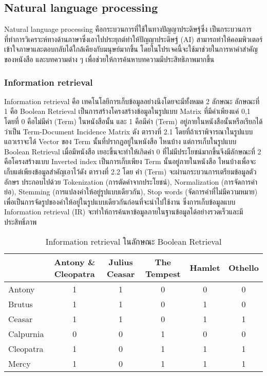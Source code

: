 \subsection{Natural language processing}

Natural language processing คือกระบวนการที่ใช้ในทางปัญญาประดิษฐ์ซึ่ง เป็นกระบวนการที่ทำการวิเคราะห์ทางด้านภาษาซึ่งเอาไปประยุกต์ทำให้ปัญญาประดิษฐ์ (AI) สามารถทำให้คอมพิวเตอร์เข้าใจภาษาและตอบกลับได้ใกล้เคียงกับมนุษย์มากขึ้น โดยในโปรเจคนี้จะใช้มาช่วยในการหาคำสำคัญของหนังสือ และบทความต่าง ๆ เพื่อช่วยให้การค้นหาบทความมีประสิทธิภาพมากขึ้น

\subsubsection{Information retrieval}

Information retrieval คือ เทคโนโลยีการเก็บข้อมูลอย่างนึงโดยจะมีทั้งหมด 2 ลักษณะ ลักษณะที่ 1 คือ Boolean Retrieval เป็นการสร้างโครงสร้างข้อมูลในรูปแบบ Matrix ที่มีค่าเพียงแค่ 0,1 โดยที่ 0 คือไม่มีคำ (Term) ในหนังสือนั้น และ 1 คือมีคำ (Term) อยู่ภายในหนังสือนั้นหรือเรียกได้ว่าเป็น Term-Document Incidence  Matrix ดัง ตารางที่ 2.1 โดยที่ถ้าเราพิจารณาในรูปแบบแถวเราจะได้ Vector ของ Term นั้นที่ปรากฏอยู่ในหนังสือ ไหนบ้าง แต่การเก็บในรูปแบบ Boolean Retrieval เมื่อมีหนังสือ เยอะขึ้นจะทำให้เกิดค่า 0 ที่ไม่มีประโยชน์มากขึ้นจึงมีลักษณะที่ 2 คือโครงสร้างแบบ Inverted index เป็นการเก็บเพียง Term นั้นอยู่ภายในหนังสือ ไหนบ้างเพื่อจะเก็บแต่เพียงข้อมูลสำคัญเอาไว้ดัง ตารางที่ 2.2 โดย คำ (Term) จะผ่านกระบวนการเตรียมข้อมูลตัวอักษร ประกอบไปด้วย Tokenization (การตัดคำจากประโยชน์), Normalization (การจัดการคำย่อ), Stemming (การแปลงคำให้อยู่รูปแบบเดียวกัน), Stop words (จัดการคำที่ไม่มีความหมาย) เพื่อเป็นการจัดรูปของคำให้อยู่ในรูปแบบเดียวกันก่อนที่จะนำไปใช้งาน ซึ่งการเก็บข้อมูลแบบ Information retrieval (IR) จะทำให้การค้นหาข้อมูลภายในฐานข้อมูลได้อย่างรวดเร็วและมีประสิทธิ์ภาพ
\begin{table}[H]
\caption{Information retrieval ในลักษณะ Boolean Retrieval}\label{tbl:ir}
    \begin{tabular}{|l|c|c|c|c|c|}
        \hline
                  & Antony \& Cleopatra & Julius Ceasar & The Tempest & Hamlet & Othello \\ \hline
        Antony    & 1                   & 1             & 0           & 0      & 0       \\ \hline
        Brutus    & 1                   & 1             & 0           & 1      & 0       \\ \hline
        Ceasar    & 1                   & 1             & 0           & 1      & 1       \\ \hline
        Calpurnia & 0                   & 0             & 1           & 0      & 0       \\ \hline
        Cleopatra & 1                   & 0             & 1           & 1      & 1       \\ \hline
        Mercy     & 1                   & 0             & 1           & 1      & 1       \\ \hline
        \end{tabular}
\end{table}


